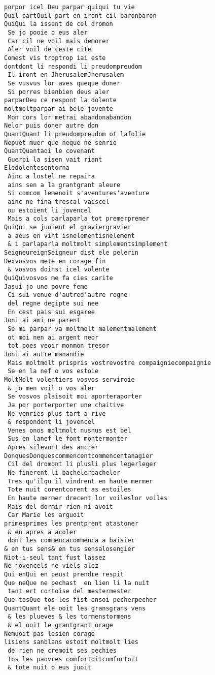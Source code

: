 \documentclass[
  letterpaper,
  DIV=11,
  numbers=noendperiod]{scrreprt}
\begin{document}
\begin{verbatim}
porpor icel Deu parpar quiqui tu vie
Quil partQuil part en iront cil baronbaron
QuiQui la issent de cel dromon
 Se jo pooie o eus aler
 Car cil ne voil mais demorer
 Aler voil de ceste cite
Comest vis troptrop iai este
dontdont li respondi li preudompreudom
 Il iront en JherusalemJherusalem
 Se vusvus lor aves queque doner
 Si porres bienbien deus aler
parparDeu ce respont la dolente
moltmoltparpar ai bele jovente
 Mon cors lor metrai abandonabandon
Nelor puis doner autre don
QuantQuant li preudompreudom ot lafolie
Nepuet muer que neque ne senrie
QuantQuantaoi le covenant
 Guerpi la sisen vait riant
Eledolentesentorna
 Ainc a lostel ne repaira
 ains sen a la grantgrant aleure
 Si comcom lemenoit s'aventures'aventure
 ainc ne fina trescal vaiscel
 ou estoient li jovencel
 Mais a cols parlaparla tot premerpremer
QuiQui se juoient el graviergravier
 a aeus en vint isnelementisnelement
 & i parlaparla moltmolt simplementsimplement
SeigneureignSeigneur dist ele pelerin
Dexvosvos mete en corage fin
 & vosvos doinst icel volente
QuiQuivosvos me fa cies carite
Jasui jo une povre feme
 Ci sui venue d'autred'autre regne
 del regne degipte sui nee
 En cest pais sui esgaree
Joni ai ami ne parent
 Se mi parpar va moltmolt malementmalement
 ot moi nen ai argent neor
 tot poes veoir monmon tresor
Joni ai autre manandie
 Mais moltmolt prispris vostrevostre compaigniecompaignie
 Se en la nef o vos estoie
MoltMolt volentiers vosvos serviroie
 & jo men voil o vos aler
 Se vosvos plaisoit moi aporteraporter
 Ja por porterporter une chaitive
 Ne venries plus tart a rive
 & respondent li jovencel
 Venes onos moltmolt nusnus est bel
 Sus en lanef le font montermonter
 Apres silevont des ancrer
DonquesDonquescommencentcommencentanagier
 Cil del dromont li plusli plus legerleger
 Ne finerent li bachelerbacheler
 Tres qu'ilqu'il vindrent en haute mermer
 Tote nuit corentcorent as estoiles
 En haute mermer drecent lor voileslor voiles
 Mais del dormir rien ni avoit
 Car Marie les arguoit
primesprimes les prentprent atastoner
 & en apres a acoler
 dont les commencacommenca a baisier
& en tus sens& en tus sensalosengier
Niot-i-seul tant fust lassez
Ne jovencels ne viels alez
Qui enQui en peust prendre respit
Que neQue ne pechast  en lien li la nuit
 tant ert cortoise del mestermester
Que tosQue tos les fist ensoi pecherpecher
QuantQuant ele ooit les gransgrans vens
 & les plueves & les tormenstormens
 & el ooit le grantgrant orage
Nemuoit pas lesien corage
lisiens sanblans estoit moltmolt lies
 de rien ne cremoit ses pechies
 Tos les paovres comfortoitcomfortoit
 & tote nuit o eus juoit

\end{verbatim}
\end{document}
